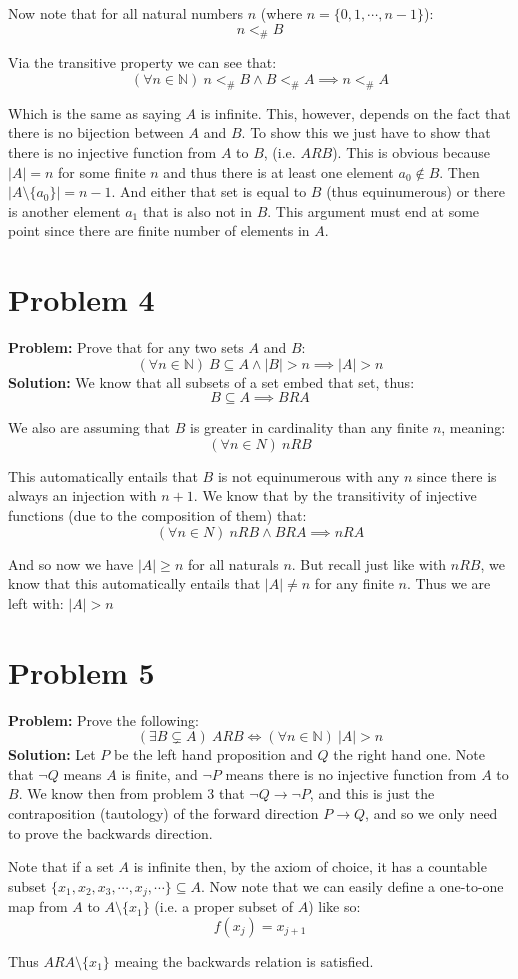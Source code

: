 \documentclass{article}
\begin{document}
Now note that for all natural numbers $n$ (where $n=\{0,1,\cdots, n-1\}$): $$n<_\# B$$

Via the transitive property we can see that:
$$(\forall n\in\mathbb N)\ n<_\# B\wedge B<_\# A\implies n<_\# A$$

Which is the same as saying $A$ is infinite. This, however, depends on the fact that there is no bijection between $A$ and $B$. To show this we just have to show that there is no injective function from $A$ to $B$, (i.e. $ARB$).
This is obvious because $|A|=n$ for some finite $n$ and thus there is at least one element $a_0\not\in B$. Then $|A\setminus\{a_0\}|=n-1$. And either that set is equal to $B$ (thus equinumerous) or there is another element $a_1$ that is also not in $B$. This argument must end at some point since there are finite number of elements in $A$.

\section*{Problem 4}
\textbf{Problem:} Prove that for any two sets $A$ and $B$:
$$(\forall n\in\mathbb N)\ B\subseteq A\wedge|B|>n\implies |A|>n$$
\textbf{Solution:} We know that all subsets of a set embed that set, thus:
$$B\subseteq A\implies BRA$$

We also are assuming that $B$ is greater in cardinality than any finite $n$, meaning:
$$(\forall n\in N)\ nRB$$

This automatically entails that $B$ is not equinumerous with any $n$ since there is always an injection with $n+1$. We know that by the transitivity of injective functions (due to the composition of them) that:
$$(\forall n\in N)\ nRB\wedge BRA\implies nRA$$

And so now we have $|A|\ge n$ for all naturals $n$. But recall just like with $nRB$, we know that this automatically entails that $|A|\not=n$ for any finite $n$. Thus we are left with: $|A|>n$

\section*{Problem 5}
\textbf{Problem:} Prove the following:
$$(\exists B\subsetneq A)\ ARB\iff (\forall n\in\mathbb N)\ |A|>n$$
\textbf{Solution:} Let $P$ be the left hand proposition and $Q$ the right hand one. Note that $\neg Q$ means $A$ is finite, and $\neg P$ means there is no injective function from $A$ to $B$. We know then from problem 3 that $\neg Q\rightarrow \neg P$, and this is just the contraposition (tautology) of the forward direction $P\rightarrow Q$, and so we only need to prove the backwards direction.

Note that if a set $A$ is infinite then, by the axiom of choice, it has a countable subset $\{x_1,x_2,x_3,\cdots,x_j,\cdots\}\subseteq A$. Now note that we can easily define a one-to-one map from $A$ to $A\setminus\{x_1\}$ (i.e. a proper subset of $A$) like so:
$$f(x_j)=x_{j+1}$$

Thus $ARA\setminus\{x_1\}$ meaing the backwards relation is satisfied.
\end{document}
